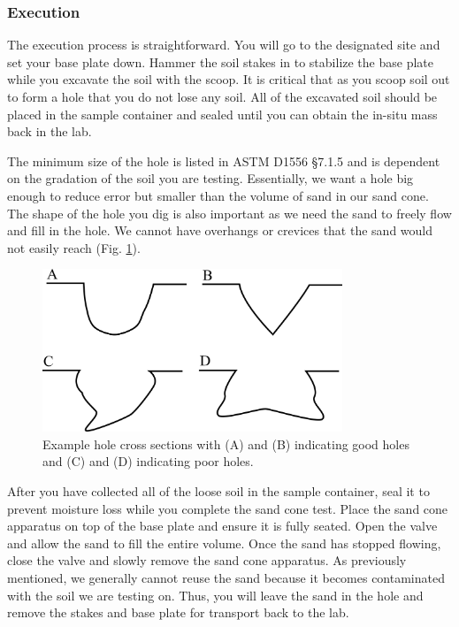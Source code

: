 \documentclass[12pt]{article}
\begin{document}
\subsubsection{Execution}
The execution process is straightforward. You will go to the designated site and set your base plate down. Hammer the soil stakes in to stabilize the base plate while you excavate the soil with the scoop. It is critical that as you scoop soil out to form a hole that you do not lose any soil. All of the excavated soil should be placed in the sample container and sealed until you can obtain the in-situ mass back in the lab.

The minimum size of the hole is listed in ASTM D1556 \S7.1.5 and is dependent on the gradation of the soil you are testing. Essentially, we want a hole big enough to reduce error but smaller than the volume of sand in our sand cone. The shape of the hole you dig is also important as we need the sand to freely flow and fill in the hole. We cannot have overhangs or crevices that the sand would not easily reach (Fig. \ref{fig:hole_cross_section}).

\begin{figure}[H]
    \centering
    \includegraphics[width=0.8\textwidth]{hole_cross_section.png}
    \caption{Example hole cross sections with (A) and (B) indicating good holes and (C) and (D) indicating poor holes.}
    \label{fig:hole_cross_section}
\end{figure}

After you have collected all of the loose soil in the sample container, seal it to prevent moisture loss while you complete the sand cone test. Place the sand cone apparatus on top of the base plate and ensure it is fully seated. Open the valve and allow the sand to fill the entire volume. Once the sand has stopped flowing, close the valve and slowly remove the sand cone apparatus. As previously mentioned, we generally cannot reuse the sand because it becomes contaminated with the soil we are testing on. Thus, you will leave the sand in the hole and remove the stakes and base plate for transport back to the lab.
\end{document}
